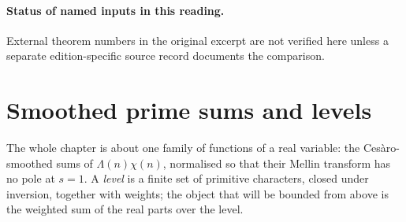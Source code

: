 

\paragraph{Status of named inputs in this reading.}
External theorem numbers in the original excerpt are not verified here unless a separate edition-specific source record documents the comparison.

\section{Smoothed prime sums and levels}\label{sec:E-level}

The whole chapter is about one family of functions of a real variable: the Ces\`aro-smoothed sums
of $\Lambda(n)\chi(n)$, normalised so that their Mellin transform has no pole at $s=1$. A
\emph{level} is a finite set of primitive characters, closed under inversion, together with weights;
the object that will be bounded from above is the weighted sum of the real parts over the level.

